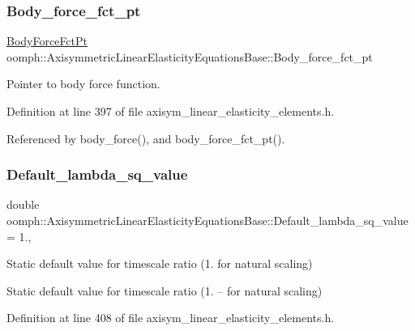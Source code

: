 \subsubsection{\texorpdfstring{Body\+\_\+force\+\_\+fct\+\_\+pt}{Body\_force\_fct\_pt}}
{\footnotesize\ttfamily \hyperlink{classoomph_1_1AxisymmetricLinearElasticityEquationsBase_afa35b69a888eecae4b5f199a1adf88c5}{Body\+Force\+Fct\+Pt} oomph\+::\+Axisymmetric\+Linear\+Elasticity\+Equations\+Base\+::\+Body\+\_\+force\+\_\+fct\+\_\+pt\hspace{0.3cm}{\ttfamily [protected]}}



Pointer to body force function. 



Definition at line 397 of file axisym\+\_\+linear\+\_\+elasticity\+\_\+elements.\+h.



Referenced by body\+\_\+force(), and body\+\_\+force\+\_\+fct\+\_\+pt().

\mbox{\label{classoomph_1_1AxisymmetricLinearElasticityEquationsBase_a9788b32107b4eacd99bdffe73e83245a}} 
\subsubsection{\texorpdfstring{Default\+\_\+lambda\+\_\+sq\+\_\+value}{Default\_lambda\_sq\_value}}
{\footnotesize\ttfamily double oomph\+::\+Axisymmetric\+Linear\+Elasticity\+Equations\+Base\+::\+Default\+\_\+lambda\+\_\+sq\+\_\+value = 1.\hspace{0.3cm}{\ttfamily [static]}, {\ttfamily [protected]}}



Static default value for timescale ratio (1. for natural scaling) 

Static default value for timescale ratio (1. -- for natural scaling) 

Definition at line 408 of file axisym\+\_\+linear\+\_\+elasticity\+\_\+elements.\+h.

